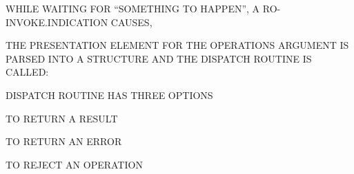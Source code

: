 \begin{bwslide}

\begin{nrtc}
\item	WHILE WAITING FOR ``SOMETHING TO HAPPEN'', A RO-INVOKE.INDICATION
	CAUSES,

\item	THE PRESENTATION ELEMENT FOR THE OPERATIONS ARGUMENT IS PARSED INTO A STRUCTURE
	AND THE DISPATCH ROUTINE IS CALLED:

\item	DISPATCH ROUTINE HAS THREE OPTIONS
    \begin{nrtc}
    \item	TO RETURN A RESULT

    \item	TO RETURN AN ERROR

    \item	TO REJECT AN OPERATION
    \end{nrtc}
\end{nrtc}
\end{bwslide}


%
%
%
%
%
%


